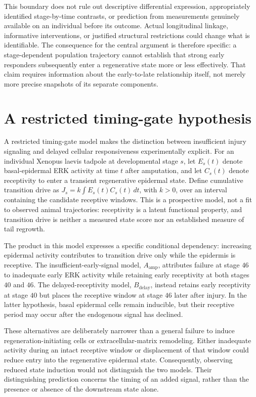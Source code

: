 \documentclass[11pt]{article}
\begin{document}
This boundary does not rule out descriptive differential expression, appropriately identified stage-by-time contrasts, or prediction from measurements genuinely available on an individual before its outcome. Actual longitudinal linkage, informative interventions, or justified structural restrictions could change what is identifiable. The consequence for the central argument is therefore specific: a stage-dependent population trajectory cannot establish that strong early responders subsequently enter a regenerative state more or less effectively. That claim requires information about the early-to-late relationship itself, not merely more precise snapshots of its separate components.

\section{A restricted timing-gate hypothesis}
A restricted timing-gate model makes the distinction between insufficient injury signaling and delayed cellular responsiveness experimentally explicit. For an individual Xenopus laevis tadpole at developmental stage $s$, let $E_s(t)$ denote basal-epidermal ERK activity at time $t$ after amputation, and let $C_s(t)$ denote receptivity to enter a transient regenerative epidermal state. Define cumulative transition drive as $J_s=k\int E_s(t)C_s(t)\,dt$, with $k>0$, over an interval containing the candidate receptive windows. This is a prospective model, not a fit to observed animal trajectories: receptivity is a latent functional property, and transition drive is neither a measured state score nor an established measure of tail regrowth.

The product in this model expresses a specific conditional dependency: increasing epidermal activity contributes to transition drive only while the epidermis is receptive. The insufficient-early-signal model, $A_{\mathrm{amp}}$, attributes failure at stage $46$ to inadequate early ERK activity while retaining early receptivity at both stages $40$ and $46$. The delayed-receptivity model, $B_{\mathrm{delay}}$, instead retains early receptivity at stage $40$ but places the receptive window at stage $46$ later after injury. In the latter hypothesis, basal epidermal cells remain inducible, but their receptive period may occur after the endogenous signal has declined.

These alternatives are deliberately narrower than a general failure to induce regeneration-initiating cells or extracellular-matrix remodeling. Either inadequate activity during an intact receptive window or displacement of that window could reduce entry into the regenerative epidermal state. Consequently, observing reduced state induction would not distinguish the two models. Their distinguishing prediction concerns the timing of an added signal, rather than the presence or absence of the downstream state alone.
\end{document}
